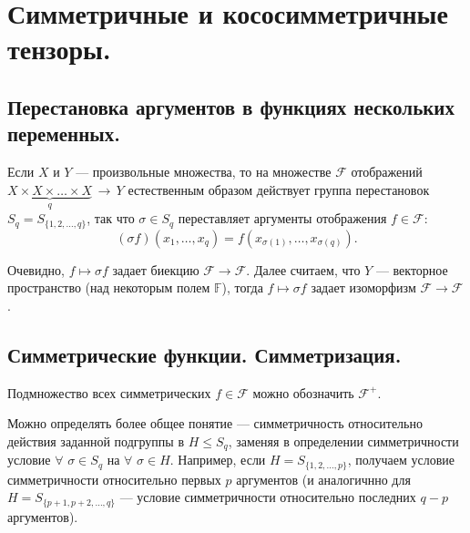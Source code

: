 
\section{Симметричные и кососимметричные тензоры. }


\subsection{Перестановка аргументов в функциях нескольких переменных.}


Если $X$ и $Y$ --- произвольные множества, то  
на множестве $\mathcal{F}$ отображений $\underbrace{X\times X\times \ldots \times X}_q \, \to \, Y$ 
естественным образом действует группа перестановок $S_q = S_{\{1, 2, \ldots, q\}}$, так что 
$\sigma \in S_q$ переставляет аргументы отображения $f\in \mathcal{F}$:
$$(\sigma f) (x_1, \ldots , x_q) = f (x_{\sigma (1)}, \ldots , x_{\sigma (q)}).$$

Очевидно, $f\mapsto \sigma f$ задает биекцию $\mathcal{F} \to \mathcal{F}$.
Далее считаем, что $Y$ --- векторное пространство (над некоторым полем $\mathbb{F}$), тогда $f\mapsto \sigma f$ задает изоморфизм $\mathcal{F} \to \mathcal{F}$.


\subsection{Симметрические функции. Симметризация.}


Подмножество всех симметрических $f\in \mathcal{F}$ можно обозначить $\mathcal{F}^+$.

Можно определять более общее понятие --- симметричность относительно 
действия заданной подгруппы в $H\leq S_q$,
заменяя в определении симметричности условие $\forall$ $\sigma \in S_q$ на $\forall$ $\sigma \in H$.
Например, если 
$H=S_{\{1, 2, \ldots, p\}}$, получаем условие симметричности относительно
первых $p$ аргументов
(и аналогичнно для $H=S_{\{p+1, p+2, \ldots, q\}}$ --- условие симметричности относительно
последних $q-p$ аргументов).




